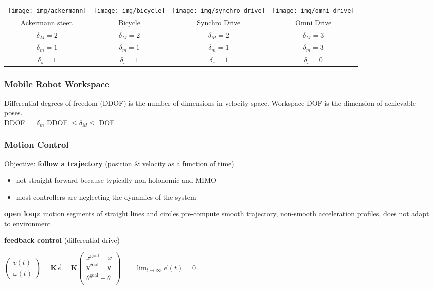 \documentclass[fontsize=6pt]{scrartcl}
\newcommand{\mat}[1]{\mathbf{#1}}
\begin{document}
\begin{multicols*}{4}
\begin{tabularx}{\linewidth}{ c | c | c | c }
	\texttt{[image: img/ackermann]}     &
	\texttt{[image: img/bicycle]}     &
	\texttt{[image: img/synchro\_drive]} &
	\texttt{[image: img/omni\_drive]}\\
	Ackermann steer. & Bicycle & Synchro Drive   & Omni Drive\\
	$\delta_M=2 $ & $\delta_M=2 $ & $\delta_M=2 $ & $\delta_M=3 $\\
	$\delta_m=1 $ & $\delta_m=1 $ & $\delta_m=1 $ & $\delta_m=3 $\\
	$\delta_s=1 $ & $\delta_s=1 $ & $\delta_s=1 $ & $\delta_s=0 $
\end{tabularx}

\subsubsection*{Mobile Robot Workspace}
Differential degrees of freedom (DDOF) is the number of dimensions in velocity space.
Workspace DOF is the dimension of achievable poses.\\
DDOF $= \delta_m$ \quad
DDOF $\leq \delta_M \leq$ DOF

\subsubsection*{Motion Control}

Objective: \textbf{follow a trajectory} (position \& velocity as a function of time)
\begin{itemize}
	\item not straight forward because typically non-holonomic and MIMO
	\item most controllers are neglecting the dynamics of the system
\end{itemize}

\textbf{open loop}: motion segments of straight lines and circles pre-compute smooth trajectory, non-smooth acceleration profiles, does not adapt to environment

\textbf{feedback control} (differential drive)

$
\begin{pmatrix}
v(t)\\
\omega(t)
\end{pmatrix}
=\mat K \vec e
= \mat K 
\begin{pmatrix}
x^\text{goal} - x\\
y^\text{goal} - y\\
\theta^\text{goal} - \theta\\
\end{pmatrix}
\qquad \lim_{t\rightarrow\infty} \vec e(t) = 0
$


\end{multicols*}
\end{document}
